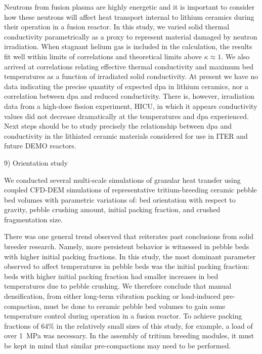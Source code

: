 Neutrons from fusion plasma are highly energetic and it is important to consider how these neutrons will affect heat transport internal to lithium ceramics during their operation in a fusion reactor. In this study, we varied solid thermal conductivity parametrically as a proxy to represent material damaged by neutron irradiation. When stagnant helium gas is included in the calculation, the results fit well within limits of correlations and theoretical limits above $\kappa \approx 1$. We also arrived at correlations relating effective thermal conductivity and maximum bed temperatures as a function of irradiated solid conductivity. At present we have no data indicating the precise quantity of expected dpa in lithium ceramics, nor a correlation between dpa and reduced conductivity. There is, however, irradiation data from a high-dose fission experiment, HICU, in which it appears conductivity values did not decrease dramatically at the temperatures and dpa experienced. Next steps should be to study precisely the relationship between dpa and conductivity in the lithiated ceramic materials considered for use in ITER and future DEMO reactors.

9) Orientation study

We conducted several multi-scale simulations of granular heat transfer using coupled CFD-DEM simulations of representative tritium-breeding ceramic pebble bed volumes with parametric variations of: bed orientation with respect to gravity, pebble crushing amount, initial packing fraction, and crushed fragmentation size.

There was one general trend observed that reiterates past conclusions from solid breeder research. Namely, more persistent behavior is witnessed in pebble beds with higher initial packing fractions. In this study, the most dominant parameter observed to affect temperatures in pebble beds was the initial packing fraction: beds with higher initial packing fraction had smaller increases in bed temperatures due to pebble crushing. We therefore conclude that manual densification, from either long-term vibration packing or load-induced pre-compaction, must be done to ceramic pebble bed volumes to gain some temperature control during operation in a fusion reactor. To achieve packing fractions of $64\%$ in the relatively small sizes of this study, for example, a load of over \SI{1}{\mega\pascal} was necessary. In the assembly of tritium breeding modules, it must be kept in mind that similar pre-compactions may need to be performed.

